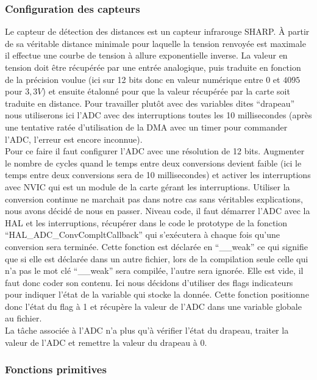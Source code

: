 \documentclass{article}
\begin{document}
\subsubsection{Configuration des capteurs}

Le capteur de détection des distances est un capteur infrarouge SHARP. À partir de sa véritable distance minimale pour laquelle la tension renvoyée est maximale il effectue une courbe de tension à allure exponentielle inverse. La valeur en tension doit être récupérée par une entrée analogique, puis traduite en fonction de la précision voulue (ici sur 12 bits donc en valeur numérique entre $0$ et $4095$ pour $3,3V$) et ensuite étalonné pour que la valeur récupérée par la carte soit traduite en distance. Pour travailler plutôt avec des variables dites ``drapeau'' nous utiliserons ici l'ADC avec des interruptions toutes les 10 millisecondes (après une tentative ratée d'utilisation de la DMA avec un timer pour commander l'ADC, l'erreur est encore inconnue).\\

Pour ce faire il faut configurer l'ADC avec une résolution de 12 bits. Augmenter le nombre de cycles quand le temps entre deux conversions devient faible (ici le temps entre deux conversions sera de 10 millisecondes) et activer les interruptions avec NVIC qui est un module de la carte gérant les interruptions. Utiliser la conversion continue ne marchait pas dans notre cas sans véritables explications, nous avons décidé de nous en passer. Niveau code, il faut démarrer l'ADC avec la HAL et les interruptions, récupérer dans le code le prototype de la fonction ``HAL\_ADC\_ConvCompltCallback'' qui s’exécutera à chaque fois qu'une conversion sera terminée. Cette fonction est déclarée en ``\_\_weak'' ce qui signifie que si elle est déclarée dans un autre fichier, lors de la compilation seule celle qui n'a pas le mot clé ``\_\_weak'' sera compilée, l'autre sera ignorée. Elle est vide, il faut donc coder son contenu. Ici nous décidons d'utiliser des flags indicateurs pour indiquer l'état de la variable qui stocke la donnée. Cette fonction positionne donc l'état du flag à 1 et récupère la valeur de l'ADC dans une variable globale au fichier. \\

La tâche associée à l'ADC n'a plus qu'à vérifier l'état du drapeau, traiter la valeur de l'ADC et remettre la valeur du drapeau à 0.

\subsubsection{Fonctions primitives}
\end{document}
